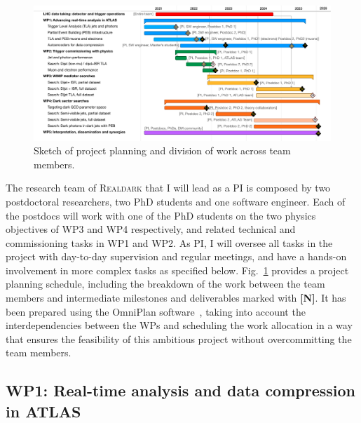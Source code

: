 \begin{figure}[!htpb] 
\begin{center}
\includegraphics[width=\textwidth]{figs_B2/gantt}
\caption{\color{black}\label{fig:gantt} \small Sketch of project planning and division of work across team members.} 
\vskip2pt
\end{center}
\end{figure}

The research team of \textsc{Realdark} that I will lead as a PI is composed by two postdoctoral researchers, two PhD students and one software engineer.
Each of the postdocs will work with one of the PhD students on the two physics objectives of WP3 and WP4 respectively, and related technical and commissioning tasks in WP1 and WP2. 
As PI, I will oversee all tasks in the project with day-to-day supervision and regular meetings, and have a hands-on involvement in more complex tasks as specified below. 
Fig.~\ref{fig:gantt} provides a project planning schedule, including the breakdown of the work between the team members and intermediate milestones and deliverables marked with \textbf{[N]}. 
It has been prepared using the OmniPlan software~\cite{omni:plan},%
taking into account the interdependencies between the WPs and 
scheduling the work allocation in a way that ensures the feasibility of this ambitious project without overcommitting the team members. 

\subsection{WP1: Real-time analysis and data compression in ATLAS}

